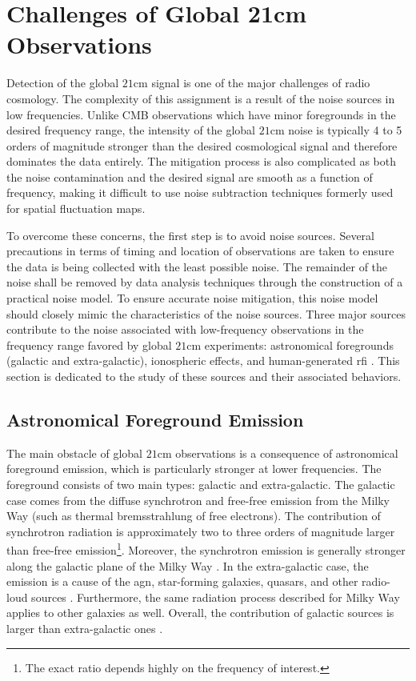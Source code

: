 \documentclass[12pt, TexShade, letterpaper]{report}
\begin{document}
\section{Challenges of Global 21cm Observations}
Detection of the global $\mathrm{21cm}$ signal is one of the major challenges of radio cosmology. The complexity of this assignment is a result of the noise sources in low frequencies. Unlike CMB observations which have minor foregrounds in the desired frequency range, the intensity of the  global $\mathrm{21cm}$ noise is typically 4 to 5 orders of magnitude stronger than the desired cosmological signal and therefore dominates the data entirely. The mitigation process is also complicated as both the noise contamination and the desired signal are smooth as a function of frequency, making it difficult to use noise subtraction techniques formerly used for spatial fluctuation maps\cite{liu2013global, thesis_moso, thesis_shedding}.\par
To overcome these concerns, the first step is to avoid noise sources. Several precautions in terms of timing and location of observations are taken to ensure the data is being collected with the least possible noise. The remainder of the noise shall be removed by data analysis techniques through the construction of a practical noise model. To ensure accurate noise mitigation, this noise model should closely mimic the characteristics of the noise sources. Three major sources contribute to the noise associated with low-frequency observations in the frequency range favored by global $\mathrm{21cm}$ experiments: astronomical foregrounds (galactic and extra-galactic), ionospheric effects, and human-generated \gls{rfi} \cite{thesis_pamela, thesis_shedding, book_21cm}. This section is dedicated to the study of these sources and their associated behaviors.\par

\subsection{Astronomical Foreground Emission}
The main obstacle of global $\mathrm{21cm}$ observations is a consequence of astronomical foreground emission, which is particularly stronger at lower frequencies. The foreground consists of two main types: galactic and extra-galactic. The galactic case comes from the diffuse synchrotron and free-free emission from the Milky Way (such as thermal bremsstrahlung of free electrons). The contribution of synchrotron radiation is approximately two to three orders of magnitude larger than free-free emission\footnote{The exact ratio depends highly on the frequency of interest.}. Moreover, the synchrotron emission is generally stronger along the galactic plane of the Milky Way \cite{thesis_shedding, thesis_pamela, pritchard_mcmc, reionization_old}.
In the extra-galactic case, the emission is a cause of the \gls{agn}, star-forming galaxies, quasars, and other radio-loud sources \cite{book_21cm}. Furthermore, the same radiation process described for Milky Way applies to other galaxies as well. Overall, the contribution of galactic sources is larger than extra-galactic ones \cite{pritchard_mcmc, reionization_old}.\par
\end{document}
